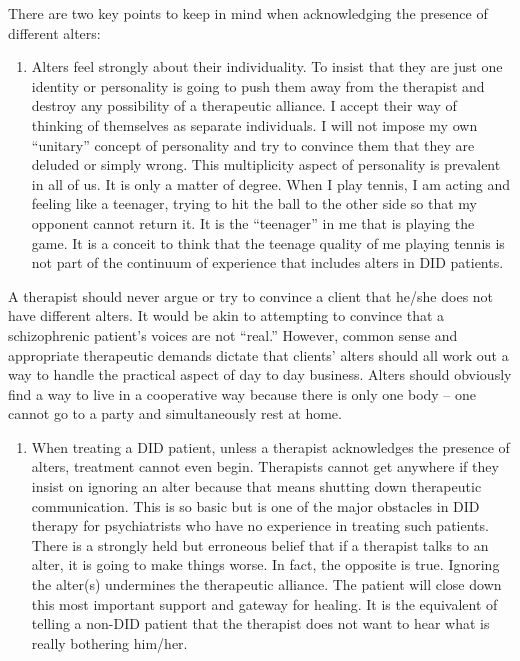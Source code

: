 \documentclass[]{book}
\providecommand{\tightlist}{%
  \setlength{\itemsep}{0pt}\setlength{\parskip}{0pt}}
\begin{document}
There are two key points to keep in mind when acknowledging the presence of different alters:

\begin{enumerate}
\def\labelenumi{\arabic{enumi}.}
\tightlist
\item
  Alters feel strongly about their individuality. To insist that they are just one identity or personality is going to push them away from the therapist and destroy any possibility of a therapeutic alliance. I accept their way of thinking of themselves as separate individuals. I will not impose my own ``unitary'' concept of personality and try to convince them that they are deluded or simply wrong. This multiplicity aspect of personality is prevalent in all of us. It is only a matter of degree. When I play tennis, I am acting and feeling like a teenager, trying to hit the ball to the other side so that my opponent cannot return it. It is the ``teenager'' in me that is playing the game. It is a conceit to think that the teenage quality of me playing tennis is not part of the continuum of experience that includes alters in DID patients.
\end{enumerate}

A therapist should never argue or try to convince a client that he/she does not have different alters. It would be akin to attempting to convince that a schizophrenic patient's voices are not ``real.'' However, common sense and appropriate therapeutic demands dictate that clients' alters should all work out a way to handle the practical aspect of day to day business. Alters should obviously find a way to live in a cooperative way because there is only one body -- one cannot go to a party and simultaneously rest at home.

\begin{enumerate}
\def\labelenumi{\arabic{enumi}.}
\setcounter{enumi}{1}
\tightlist
\item
  When treating a DID patient, unless a therapist acknowledges the presence of alters, treatment cannot even begin. Therapists cannot get anywhere if they insist on ignoring an alter because that means shutting down therapeutic communication. This is so basic but is one of the major obstacles in DID therapy for psychiatrists who have no experience in treating such patients. There is a strongly held but erroneous belief that if a therapist talks to an alter, it is going to make things worse. In fact, the opposite is true. Ignoring the alter(s) undermines the therapeutic alliance. The patient will close down this most important support and gateway for healing. It is the equivalent of telling a non-DID patient that the therapist does not want to hear what is really bothering him/her.
\end{enumerate}
\end{document}
